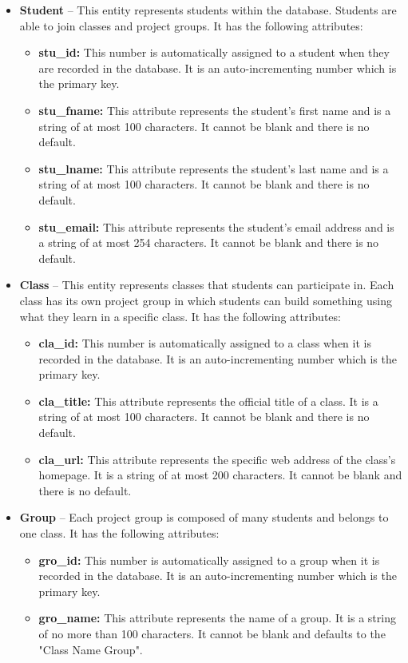 \documentclass[12pt]{article}
\begin{document}
\begin{itemize}
	\item \textbf{Student} -- This entity represents students within the database. Students are able to join classes and project groups. It has the following attributes:
	\begin{itemize}
		\item \textbf{stu\_id:} This number is automatically assigned to a student when they are recorded in the database. It is an auto-incrementing number which is the primary key. 
		\item \textbf{stu\_fname:} This attribute represents the student's first name and is a string of at most 100 characters. It cannot be blank and there is no default.
		\item \textbf{stu\_lname:} This attribute represents the student's last name and is a string of at most 100 characters. It cannot be blank and there is no default.
		\item \textbf{stu\_email:} This attribute represents the student's email address and is a string of at most 254 characters. It cannot be blank and there is no default.
	\end{itemize}

	\item \textbf{Class} -- This entity represents classes that students can participate in. Each class has its own project group in which students can build something using what they learn in a specific class. It has the following attributes:
	\begin{itemize}
		\item \textbf{cla\_id:} This number is automatically assigned to a class when it is recorded in the database. It is an auto-incrementing number which is the primary key. 
		\item \textbf{cla\_title:} This attribute represents the official title of a class. It is a string of at most 100 characters. It cannot be blank and there is no default.
		\item \textbf{cla\_url:} This attribute represents the specific web address of the class's homepage. It is a string of at most 200 characters. It cannot be blank and there is no default. 
	\end{itemize}

	\item \textbf{Group} -- Each project group is composed of many students and belongs to one class. It has the following attributes:
	\begin{itemize}
		\item \textbf{gro\_id:} This number is automatically assigned to a group when it is recorded in the database. It is an auto-incrementing number which is the primary key. 
		\item \textbf{gro\_name:} This attribute represents the name of a group. It is a string of no more than 100 characters. It cannot be blank and defaults to the "{Class Name} Group". 
	\end{itemize}


\end{itemize}
\end{document}

